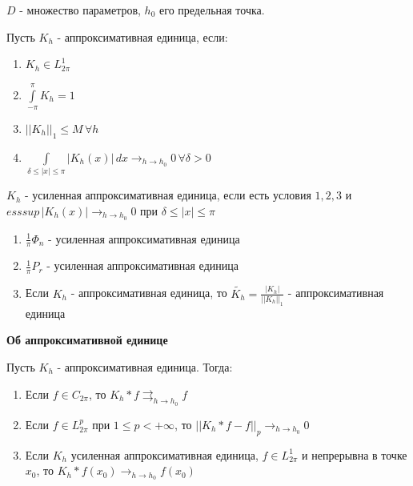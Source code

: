 \begin{definition}
    $D$ - множество параметров, $h_0$ его предельная точка.

    Пусть $K_h$ - аппроксимативная единица, если:

    \begin{enumerate}
        \item $K_h \in L_{2\pi}^1$
        \item $\int\limits_{-\pi}^\pi K_h = 1$
        \item $||K_h||_1 \leqslant M \, \forall h$
        \item $\int\limits_{\delta \leqslant |x| \leqslant \pi} |K_h (x)| \, dx \rightarrow_{h \to h_0} 0 \, \forall \delta > 0$
    \end{enumerate}

    $K_h$ - усиленная аппроксимативная единица, если есть условия $1, 2, 3$ и $esssup \, |K_h (x)| \rightarrow_{h \to h_0} 0$ при $\delta \leqslant |x| \leqslant \pi$
\end{definition}

\begin{example}
    \begin{enumerate}
        \item $\frac{1}{\pi} \Phi_n$ - усиленная аппроксимативная единица
        \item $\frac{1}{\pi} P_r$ - усиленная аппроксимативная единица
        \item Если $K_h$ - аппроксимативная единица, то $\tilde{K_h} = \frac{|K_h|}{||K_h||_1}$ - аппроксимативная единица
    \end{enumerate}
\end{example}

\begin{theorem}
    \textbf{Об аппроксимативной единице}

    Пусть $K_h$ - аппроксимативная единица. Тогда:

    \begin{enumerate}
        \item Если $f \in C_{2\pi}$, то $K_h * f \rightrightarrows_{h \to h_0} f $
        \item Если $f \in L_{2\pi}^p$ при $1 \leqslant p < +\infty$, то $||K_h * f - f||_p \rightarrow_{h \to h_0} 0 $
        \item Если $K_h$ усиленная аппроксимативная единица, $f \in L_{2\pi}^1$ и непрерывна в точке $x_0$, то $K_h * f (x_0) \rightarrow_{h \to h_0} f(x_0)$
    \end{enumerate}
\end{theorem}

